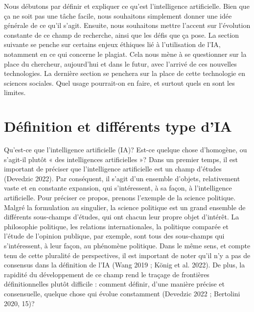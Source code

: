 \documentclass[
  letterpaper,
]{scrbook}
\begin{document}
Nous débutons par définir et expliquer ce qu'est l'intelligence
artificielle. Bien que ça ne soit pas une tâche facile, nous souhaitons
simplement donner une idée générale de ce qu'il s'agit. Ensuite, nous
souhaitons mettre l'accent sur l'évolution constante de ce champ de
recherche, ainsi que les défis que ça pose. La section suivante se
penche sur certains enjeux éthiques lié à l'utilisation de l'IA,
notamment en ce qui concerne le plagiat. Cela nous mène à se questionner
sur la place du chercheur, aujourd'hui et dans le futur, avec l'arrivé
de ces nouvelles technologies. La dernière section se penchera sur la
place de cette technologie en sciences sociales. Quel usage pourrait-on
en faire, et surtout quels en sont les limites.

\hypertarget{duxe9finition-et-diffuxe9rents-type-dia}{%
\section{Définition et différents type
d'IA}\label{duxe9finition-et-diffuxe9rents-type-dia}}

Qu'est-ce que l'intelligence artificielle (IA)? Est-ce quelque chose
d'homogène, ou s'agit-il plutôt « des intelligences artificielles »?
Dans un premier temps, il est important de préciser que l'intelligence
artificielle est un champ d'études (Devedzic 2022). Par conséquent, il
s'agit d'un ensemble d'objets, relativement vaste et en constante
expansion, qui s'intéressent, à sa façon, à l'intelligence artificielle.
Pour préciser ce propos, prenons l'exemple de la science politique.
Malgré la formulation au singulier, la science politique est un grand
ensemble de différents sous-champs d'études, qui ont chacun leur propre
objet d'intérêt. La philosophie politique, les relations
internationales, la politique comparée et l'étude de l'opinion publique,
par exemple, sont tous des sous-champs qui s'intéressent, à leur façon,
au phénomène politique. Dans le même sens, et compte tenu de cette
pluralité de perspectives, il est important de noter qu'il n'y a pas de
consensus dans la définition de l'IA (Wang 2019 ; König et al. 2022). De
plus, la rapidité du développement de ce champ rend le traçage de
frontières définitionnelles plutôt difficile : comment définir, d'une
manière précise et consensuelle, quelque chose qui évolue constamment
(Devedzic 2022 ; Bertolini 2020, 15)?
\end{document}
